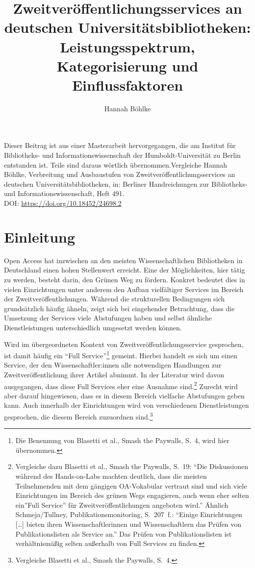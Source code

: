 \documentclass[a4paper,
fontsize=11pt,
oneside,
numbers=noperiodatend,
parskip=half-,
bibliography=totoc,
final
]{scrartcl}
\title{\LARGE{Zweitveröffentlichungsservices an deutschen Universitätsbibliotheken: Leistungsspektrum, Kategorisierung und Einflussfaktoren}}%
\author{Hannah Böhlke} %
\date{}
\begin{document}
\maketitle
\thispagestyle{fancyplain} 


Dieser Beitrag ist aus einer Masterarbeit hervorgegangen, die am
Institut für Bibliotheks- und Informationswissenschaft der
Humboldt-Universität zu Berlin entstanden ist. Teile sind daraus
wörtlich übernommen.Vergleiche Hannah Böhlke, Verbreitung und
Ausbaustufen von Zweitveröffentlichungsservices an deutschen
Universitätsbibliotheken, in: Berliner Handreichungen zur Bibliotheks-
und Informationswissenschaft, Heft 491.\\
DOI: \url{https://doi.org/10.18452/24698.2}

\hypertarget{einleitung}{%
\section{Einleitung}\label{einleitung}}

Open Access hat inzwischen an den meisten Wissenschaftlichen
Bibliotheken in Deutschland einen hohen Stellenwert erreicht. Eine der
Möglichkeiten, hier tätig zu werden, besteht darin, den Grünen Weg zu
fördern. Konkret bedeutet dies in vielen Einrichtungen unter anderem den
Aufbau vielfältiger Services im Bereich der Zweitveröffentlichungen.
Während die strukturellen Bedingungen sich grundsätzlich häufig ähneln,
zeigt sich bei eingehender Betrachtung, dass die Umsetzung der Services
viele Abstufungen haben und selbst ähnliche Dienstleistungen
unterschiedlich umgesetzt werden können.

Wird im übergeordneten Kontext von Zweitveröffentlichungsservice
gesprochen, ist damit häufig ein \enquote{Full Service}\footnote{Die
  Benennung von Blasetti et al., Smash the Paywalls, S.~4, wird hier
  übernommen.} gemeint. Hierbei handelt es sich um einen Service, der
den Wissenschaftler:innen alle notwendigen Handlungen zur
Zweitveröffentlichung ihrer Artikel abnimmt. In der Literatur wird davon
ausgegangen, dass diese Full Services eher eine Ausnahme
sind.\footnote{Vergleiche dazu Blasetti et al., Smash the Paywalls,
  S.~19: \enquote{Die Diskussionen während des Hands-on-Labs machten
  deutlich, dass die meisten Teilnehmenden mit dem gängigen OA-Vokabular
  vertraut sind und sich viele Einrichtungen im Bereich des grünen Wegs
  engagieren, auch wenn eher selten ein}Full Service'' für
  Zweitveröffentlichungen angeboten wird.'' Ähnlich Schmeja/Tullney,
  Publikationsmonitoring, S.~207~f.: \enquote{Einige Einrichtungen
  {[}\ldots{]} bieten ihren Wissenschaftlerinnen und Wissenschaftlern
  das Prüfen von Publikationslisten als Service an.} Das Prüfen von
  Publikationslisten ist verhältnismäßig selten außerhalb von Full
  Services zu finden.} Zurecht wird aber darauf hingewiesen, dass es in
diesem Bereich vielfache Abstufungen geben kann. Auch innerhalb der
Einrichtungen wird von verschiedenen Dienstleistungen gesprochen, die
diesem Bereich zuzuordnen sind.\footnote{Vergleiche Blasetti et al.,
  Smash the Paywalls, S.~4.}
\end{document}
